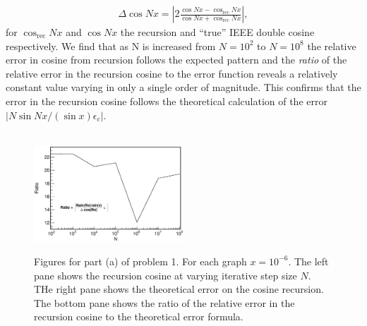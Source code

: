\documentclass[singlepage,notitlepage,nofootinbib,11pt]{revtex4-1}
\begin{document}
\begin{align*}
\Delta\cos N x = \left|2\frac{\cos N x - \cos_{\text{rec}}Nx}{\cos N x + \cos_{\text{rec}}Nx}\right|,
\end{align*}
for $\cos_{\text{rec}} Nx$ and $\cos Nx$ the recursion and ``true'' IEEE double cosine respectively. We find that as N is increased from $N=10^{2}$ to $N=10^8$ the relative error in cosine from recursion follows the expected pattern and the {\it ratio} of the relative error in the recursion cosine to the error function reveals a relatively constant value varying in only a single order of magnitude. This confirms that the error in the recursion cosine follows the theoretical calculation of the error $|N\sin N x/(\sin x)\epsilon_c|$.
\begin{figure}[h]
  \centering
{}
\\
  \includegraphics[width=0.5\textwidth]{figures/1a_ratio.eps}
  \hfill
  \caption{Figures for part (a) of problem 1. For each graph $x = 10^{-6}$. The left pane shows the recursion cosine at varying iterative step size $N$. THe right pane shows the theoretical error on the cosine recursion. The bottom pane shows the ratio of the relative error in the recursion cosine to the theoretical error formula.}
\end{figure}\\
\end{document}
